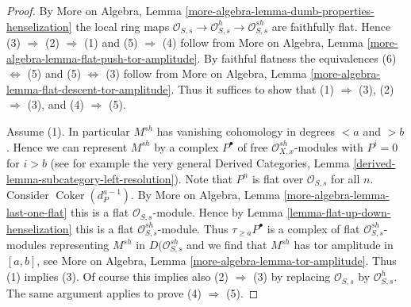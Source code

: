 \documentclass[10pt,a4paper]{amsart}
\theoremstyle{plain}
\theoremstyle{definition}
\theoremstyle{remark}
\numberwithin{equation}{subsection}
\def\Coker{\mathop{\mathrm{Coker}}}
\begin{document}
\begin{proof}
By More on Algebra, Lemma
\ref{more-algebra-lemma-dumb-properties-henselization}
the local ring maps
$\mathcal{O}_{S, s} \to \mathcal{O}_{S, s}^h \to \mathcal{O}_{S, s}^{sh}$
are faithfully flat.
Hence (3) $\Rightarrow$ (2) $\Rightarrow$ (1) and
(5) $\Rightarrow$ (4) follow from
More on Algebra, Lemma \ref{more-algebra-lemma-flat-push-tor-amplitude}.
By faithful flatness the equivalences (6) $\Leftrightarrow$ (5) and
(5) $\Leftrightarrow$ (3) follow from
More on Algebra, Lemma \ref{more-algebra-lemma-flat-descent-tor-amplitude}.
Thus it suffices to show that
(1) $\Rightarrow$ (3), (2) $\Rightarrow$ (3), and (4) $\Rightarrow$ (5).

\medskip\noindent
Assume (1). In particular $M^{sh}$ has vanishing cohomology
in degrees $< a$ and $> b$. Hence we can represent $M^{sh}$ by a complex
$P^\bullet$ of free $\mathcal{O}_{X, x}^{sh}$-modules with
$P^i = 0$ for $i > b$
(see for example the very general
Derived Categories, Lemma \ref{derived-lemma-subcategory-left-resolution}).
Note that $P^n$ is flat over $\mathcal{O}_{S, s}$ for all $n$.
Consider $\Coker(d_P^{a - 1})$. By More on Algebra, Lemma
\ref{more-algebra-lemma-last-one-flat}
this is a flat $\mathcal{O}_{S, s}$-module.
Hence by Lemma \ref{lemma-flat-up-down-henselization}
this is a flat $\mathcal{O}_{S, s}^{sh}$-module.
Thus $\tau_{\geq a}P^\bullet$ is a complex of
flat $\mathcal{O}_{S, s}^{sh}$-modules representing $M^{sh}$
in $D(\mathcal{O}_{S, s}^{sh}$ and we find that
$M^{sh}$ has tor amplitude in $[a, b]$, see
More on Algebra, Lemma \ref{more-algebra-lemma-tor-amplitude}.
Thus (1) implies (3). Of course this implies also
(2) $\Rightarrow$ (3) by replacing $\mathcal{O}_{S, s}$ by
$\mathcal{O}_{S, s}^h$. The same argument applies to prove
(4) $\Rightarrow$ (5).
\end{proof}
\end{document}
